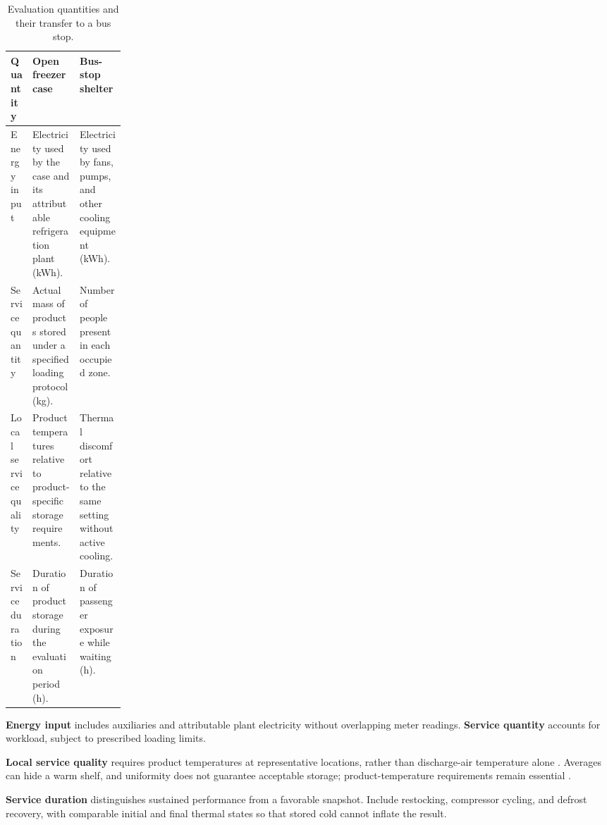 \documentclass[12pt]{article}
\begin{document}
\begin{table}[!ht]
\centering
\caption{Evaluation quantities and their transfer to a bus stop.}
\label{tab:service}
\small
\renewcommand{\arraystretch}{1.18}
\begin{tabularx}{\linewidth}{@{}>{\raggedright\arraybackslash}p{0.19\linewidth}
>{\raggedright\arraybackslash}X >{\raggedright\arraybackslash}X@{}}
\toprule
Quantity & Open freezer case & Bus-stop shelter\\
\midrule
Energy input & Electricity used by the case and its attributable refrigeration plant (kWh). & Electricity used by fans, pumps, and other cooling equipment (kWh).\\
Service quantity & Actual mass of products stored under a specified loading protocol (kg). & Number of people present in each occupied zone.\\
Local service quality & Product temperatures relative to product-specific storage requirements. & Thermal discomfort relative to the same setting without active cooling.\\
Service duration & Duration of product storage during the evaluation period (h). & Duration of passenger exposure while waiting (h).\\
\bottomrule
\end{tabularx}
\end{table}

\noindent\textbf{Energy input} includes auxiliaries and attributable plant electricity without overlapping meter readings. \textbf{Service quantity} accounts for workload, subject to prescribed loading limits.

\textbf{Local service quality} requires product temperatures at representative locations, rather than discharge-air temperature alone \cite{ashrae}. Averages can hide a warm shelf, and uniformity does not guarantee acceptable storage; product-temperature requirements remain essential \cite{etl}.

\textbf{Service duration} distinguishes sustained performance from a favorable snapshot. Include restocking, compressor cycling, and defrost recovery, with comparable initial and final thermal states so that stored cold cannot inflate the result.
\end{document}
